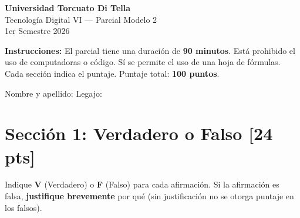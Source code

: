 \documentclass[11pt,a4paper]{article}
\newcommand{\puntaje}[1]{\textbf{[#1 pts]}}
\begin{document}
\begin{center}
  {\Large\bfseries Universidad Torcuato Di Tella}\\[4pt]
  {\large Tecnolog\'ia Digital VI --- Parcial Modelo 2}\\[2pt]
  {\normalsize 1er Semestre 2026}\\[8pt]
\end{center}

\begin{infobox}
\textbf{Instrucciones:} El parcial tiene una duraci\'on de \textbf{90 minutos}. Est\'a prohibido el uso de computadoras o c\'odigo. S\'i se permite el uso de una hoja de f\'ormulas. Cada secci\'on indica el puntaje. Puntaje total: \textbf{100 puntos}.
\end{infobox}

\vspace{0.5cm}

Nombre y apellido: \underline{\hspace{8cm}} \hfill Legajo: \underline{\hspace{3cm}}

\vspace{0.8cm}

\section*{Secci\'on 1: Verdadero o Falso \puntaje{24}}

\noindent Indique \textbf{V} (Verdadero) o \textbf{F} (Falso) para cada afirmaci\'on. Si la afirmaci\'on es falsa, \textbf{justifique brevemente} por qu\'e (sin justificaci\'on no se otorga puntaje en los falsos).

\vspace{0.3cm}
\end{document}

